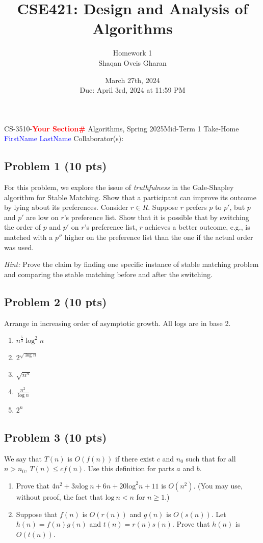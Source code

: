 \documentclass[12pt]{article}
\title{\textbf{CSE421: Design and Analysis of Algorithms}}
\author{Homework 1 \\ Shaqan Oveis Gharan}
\date{March 27th, 2024 \\ Due: April 3rd, 2024 at 11:59 PM}
\newcommand{\red}[1]{\textcolor{red}{#1}}
\newcommand{\blue}[1]{\textcolor{blue}{#1}}
\begin{document}
\noindent CS-3510-\textbf{\red{Your Section\#}} Algorithms, Spring 2025\hfill Mid-Term 1 Take-Home\\
\blue{FirstName} \blue{LastName} \hfill Collaborator(s):

\hrulefill

\subsection*{Problem 1 (10 pts)}
For this problem, we explore the issue of \textit{truthfulness} in the Gale-Shapley algorithm for Stable Matching. Show that a participant can improve its outcome by lying about its preferences. Consider $r \in R$. Suppose $r$ prefers $p$ to $p'$, but $p$ and $p'$ are low on $r$'s preference list. Show that it is possible that by switching the order of $p$ and $p'$ on $r$'s preference list, $r$ achieves a better outcome, e.g., is matched with a $p''$ higher on the preference list than the one if the actual order was used.

\textit{Hint:} Prove the claim by finding one specific instance of stable matching problem and comparing the stable matching before and after the switching.

\subsection*{Problem 2 (10 pts)}
Arrange in increasing order of asymptotic growth. All logs are in base 2.

\begin{enumerate}
    \item \( n^{\frac{5}{3}} \log^2 n \)
    \item \( 2^{\sqrt{\log n}} \)
    \item \( \sqrt{n^n} \)
    \item \( \frac{n^2}{\log n} \)
    \item \( 2^n \)
\end{enumerate}


\subsection*{Problem 3 (10 pts)}
We say that $T(n)$ is $O(f(n))$ if there exist $c$ and $n_0$ such that for all $n > n_0,\:T(n) \le cf(n)$. Use this definition for parts $a$ and $b$.
\begin{enumerate}
    \item Prove that $4n^2 + 3n\text{log}\:n + 6n + 20\text{log}^2n + 11$ is $O(n^2)$. (You may use, without proof, the fact that $\text{log}\:n < n$ for $n \ge 1$.)
    \item Suppose that $f(n)$ is $O(r(n))$ and $g(n)$ is $O(s(n))$. Let $h(n) = f(n)g(n)$ and $t(n) = r(n)s(n)$. Prove that $h(n)$ is $O(t(n))$.
\end{enumerate}
\end{document}
